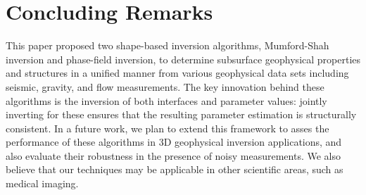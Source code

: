 \documentclass[manuscript,revised]{geophysics}
\begin{document}
\section{Concluding Remarks}
This paper proposed two shape-based inversion algorithms, Mumford-Shah inversion and phase-field inversion, to determine subsurface geophysical properties and structures in a unified manner from various geophysical data sets including seismic, gravity, and flow measurements.  The key innovation behind these algorithms is the inversion of both interfaces and parameter values: jointly inverting for these ensures that the resulting parameter estimation is structurally consistent.  In a future work, we plan to extend this framework to asses the performance of these algorithms in 3D geophysical inversion applications, and also evaluate their robustness in the presence of noisy measurements. We also believe that our techniques may be applicable in other scientific areas, such as medical imaging.


\newpage
 


\newpage
\listoffigures
\newpage
\end{document}
